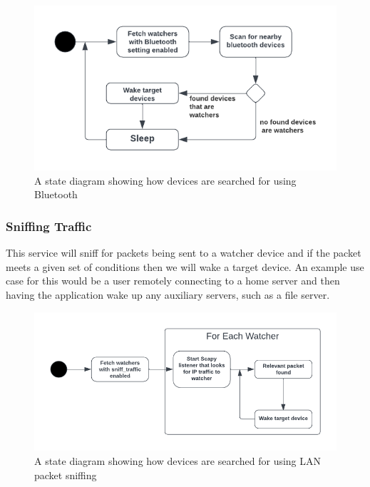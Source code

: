 \begin{figure}[H]
    \centering
    \includegraphics[width=\columnwidth]{assets/bluetooth.png}
    \caption{A state diagram showing how devices are searched for using Bluetooth}
    \label{fig:my_label}
\end{figure}


\vspace{2mm}
\subsubsection{Sniffing Traffic}

This service will sniff for packets being sent to a watcher device and if the packet meets a given set of conditions then we will wake a target device. An example use case for this would be a user remotely connecting to a home server and then having the application wake up any auxiliary servers, such as a file server. 

\begin{figure}[H]
    \centering
    \includegraphics[width=\columnwidth]{assets/sniffer.png}
    \caption{A state diagram showing how devices are searched for using LAN packet sniffing}
    \label{fig:my_label}
\end{figure}

